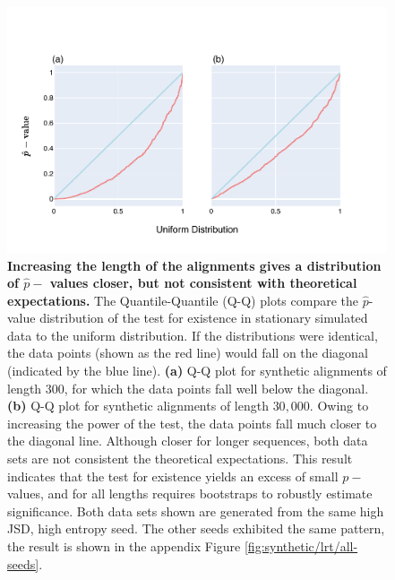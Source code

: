 \begin{figure}[!ht]
\centering
\includegraphics[width=\textwidth]{figures/plots/synthetic/lrt/197113_332182_17210-long_seq.pdf}
\caption{\textbf{Increasing the length of the alignments gives a distribution of $\hat p-$ values closer, but not consistent with theoretical expectations.} The Quantile-Quantile (Q-Q) plots compare the $\hat p$-value distribution of the test for existence in stationary simulated data to the uniform distribution. If the distributions were identical, the data points (shown as the red line) would fall on the diagonal (indicated by the blue line). \textbf{(a)} Q-Q plot for synthetic alignments of length $300$, for which the data points fall well below the diagonal. \textbf{(b)} Q-Q plot for synthetic alignments of length $30,000$. Owing to increasing the power of the test, the data points fall much closer to the diagonal line. Although closer for longer sequences, both data sets are not consistent the theoretical expectations. This result indicates that the test for existence yields an excess of small $p-$ values, and for all lengths requires bootstraps to robustly estimate significance. Both data sets shown are generated from the same high JSD, high entropy seed. The other seeds exhibited the same pattern, the result is shown in the appendix Figure \ref{fig:synthetic/lrt/all-seeds}.}
\label{fig:synthetic/lrt/197113-long_seq}
\end{figure}